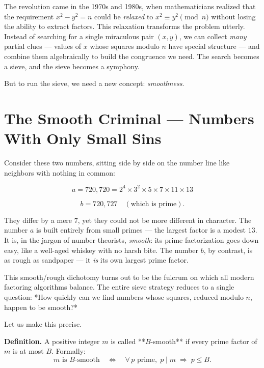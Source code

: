 The revolution came in the 1970s and 1980s, when mathematicians realized that the requirement $x^2 - y^2 = n$ could be \textit{relaxed} to $x^2 \equiv y^2 \pmod{n}$ without losing the ability to extract factors. This relaxation transforms the problem utterly. Instead of searching for a single miraculous pair $(x, y)$, we can collect \textit{many} partial clues --- values of $x$ whose squares modulo $n$ have special structure --- and combine them algebraically to build the congruence we need. The search becomes a sieve, and the sieve becomes a symphony.

But to run the sieve, we need a new concept: \textit{smoothness}.

\bigskip

\section*{The Smooth Criminal --- Numbers With Only Small Sins}

Consider these two numbers, sitting side by side on the number line like neighbors with nothing in common:

\[
a = 720{,}720 = 2^4 \times 3^2 \times 5 \times 7 \times 11 \times 13
\]

\[
b = 720{,}727 \quad (\text{which is prime}).
\]

They differ by a mere $7$, yet they could not be more different in character. The number $a$ is built entirely from small primes --- the largest factor is a modest $13$. It is, in the jargon of number theorists, \textit{smooth}: its prime factorization goes down easy, like a well-aged whiskey with no harsh bite. The number $b$, by contrast, is as rough as sandpaper --- it \textit{is} its own largest prime factor.

This smooth/rough dichotomy turns out to be the fulcrum on which all modern factoring algorithms balance. The entire sieve strategy reduces to a single question: *How quickly can we find numbers whose squares, reduced modulo $n$, happen to be smooth?*

Let us make this precise.


\begin{displayquote}
\textbf{Definition.} A positive integer $m$ is called **$B$-smooth** if every prime factor of $m$ is at most $B$. Formally:
$$m \text{ is } B\text{-smooth} \quad\Longleftrightarrow\quad \forall\, p \text{ prime},\; p \mid m \;\Rightarrow\; p \leq B.$$
\end{displayquote}


